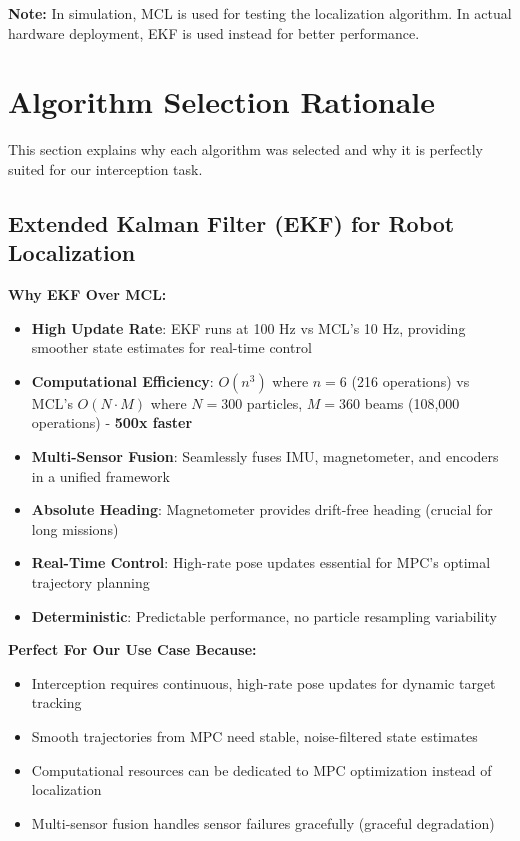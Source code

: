 \documentclass[11pt]{article}
\begin{document}
\textbf{Note:} In simulation, MCL is used for testing the localization algorithm. In actual hardware deployment, EKF is used instead for better performance.

\section{Algorithm Selection Rationale}

This section explains why each algorithm was selected and why it is perfectly suited for our interception task.

\subsection{Extended Kalman Filter (EKF) for Robot Localization}

\textbf{Why EKF Over MCL:}

\begin{itemize}
    \item \textbf{High Update Rate}: EKF runs at 100 Hz vs MCL's 10 Hz, providing smoother state estimates for real-time control
    \item \textbf{Computational Efficiency}: $O(n^3)$ where $n=6$ (216 operations) vs MCL's $O(N \cdot M)$ where $N=300$ particles, $M=360$ beams (108,000 operations) - \textbf{500x faster}
    \item \textbf{Multi-Sensor Fusion}: Seamlessly fuses IMU, magnetometer, and encoders in a unified framework
    \item \textbf{Absolute Heading}: Magnetometer provides drift-free heading (crucial for long missions)
    \item \textbf{Real-Time Control}: High-rate pose updates essential for MPC's optimal trajectory planning
    \item \textbf{Deterministic}: Predictable performance, no particle resampling variability
\end{itemize}

\textbf{Perfect For Our Use Case Because:}
\begin{itemize}
    \item Interception requires continuous, high-rate pose updates for dynamic target tracking
    \item Smooth trajectories from MPC need stable, noise-filtered state estimates
    \item Computational resources can be dedicated to MPC optimization instead of localization
    \item Multi-sensor fusion handles sensor failures gracefully (graceful degradation)
\end{itemize}
\end{document}
